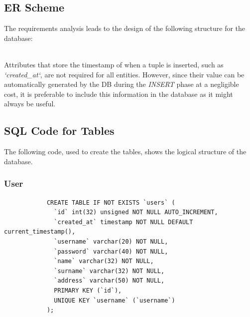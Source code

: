 \documentclass[12pt, a4paper, renqo, final]{amsart}
\begin{document}
		\subsection{ER Scheme}
		The requirements analysis leads to the design of the following structure for the database:
		\begin{figure}[h]
		\noindent {}
		\end{figure}
		\phantom{.}\\
		Attributes that store the timestamp of when a tuple is inserted, such as \textit{`created\_at`}, are not required for all entities. However, since their value can be automatically generated by the DB during the \textit{INSERT} phase at a negligible cost, it is preferable to include this information in the database as it might always be useful.

		\subsection{SQL Code for Tables}
		The following code, used to create the tables, shows the logical structure of the database.\\
		\subsubsection{User}
		\phantom{.}
		\begin{lstlisting}
			CREATE TABLE IF NOT EXISTS `users` (
			  `id` int(32) unsigned NOT NULL AUTO_INCREMENT,
			  `created_at` timestamp NOT NULL DEFAULT current_timestamp(),
			  `username` varchar(20) NOT NULL,
			  `password` varchar(40) NOT NULL,
			  `name` varchar(32) NOT NULL,
			  `surname` varchar(32) NOT NULL,
			  `address` varchar(50) NOT NULL,
			  PRIMARY KEY (`id`),
			  UNIQUE KEY `username` (`username`)
			);
		\end{lstlisting}
		\phantom{.}\\	
\end{document}
